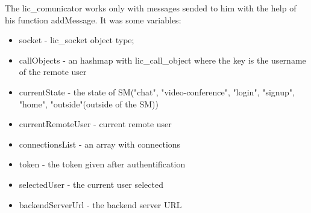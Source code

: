 The lic_comunicator works only with messages sended to him with the help of his function addMessage. It was some variables:
\begin{itemize}
    \item socket  - lic_socket object type;
    \item callObjects - an hashmap with lic_call_object where the key is the username of the remote user
    \item currentState - the state of SM("chat", "video-conference", "login", "signup", "home", "outside"(outside of the SM))
    \item currentRemoteUser - current remote user
    \item connectionsList - an array with connections
    \item token - the token given after authentification
    \item selectedUser - the current user selected
    \item backendServerUrl - the backend server URL
\end{itemize}

